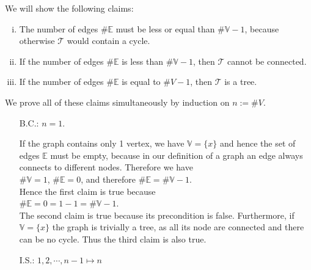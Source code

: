 \proof
We will show the following claims:
\begin{enumerate}[(i)]
\item The number of edges $\# \mathbb{E}$ must be less or equal than $\#\mathbb{V}-1$, because otherwise $\mathcal{T}$ would contain a cycle.
\item If the number of edges $\# \mathbb{E}$ is less than  $\#\mathbb{V}-1$, then $\mathcal{T}$ cannot be connected.
\item If the number of edges $\# \mathbb{E}$ is equal to $\#V - 1$, then $\mathcal{T}$ is a tree.
\end{enumerate}
We prove all of these claims simultaneously by induction on $n := \#V$.
\begin{enumerate}
\item[B.C.:] $n = 1$.

  If the graph contains only 1 vertex, we have $\mathbb{V} = \{x\}$ and hence the set of edges $\mathbb{E}$
  must be empty, because in our definition of a graph an edge always connects to different nodes. Therefore we
  have 
  \\[0.2cm]
  \hspace*{1.3cm}
  $\#\mathbb{V} = 1$, \quad $\#\mathbb{E} = 0$, \quad and therefore \quad $\#\mathbb{E} = \#\mathbb{V}-1$.
  \\[0.2cm]
  Hence the first claim is true because
  \\[0.2cm]
  \hspace*{1.3cm}
  $\#\mathbb{E} = 0 = 1 - 1 = \#\mathbb{V} - 1$.
  \\[0.2cm]
  The second claim is true because its precondition is false.
  Furthermore, if $\mathbb{V} = \{x\}$  the graph is trivially a tree, as all its node are connected and there
  can be no cycle.   Thus the third claim is also true.
\item[I.S.:] $1, 2, \cdots, n-1 \mapsto n$


\end{enumerate}
